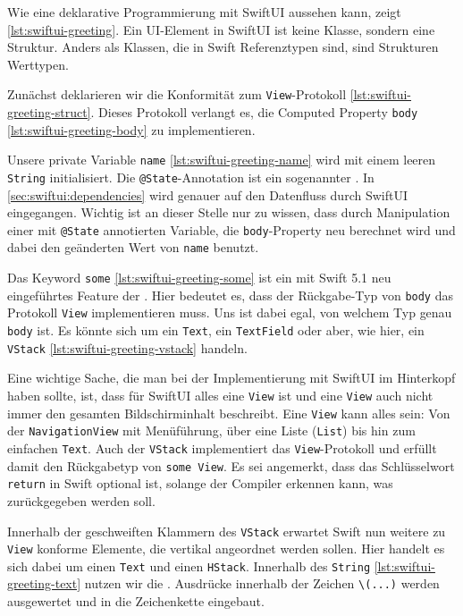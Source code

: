 \begin{bsp}
Wie eine deklarative Programmierung mit SwiftUI \cite{Apple::SwiftUI-Documentation} aussehen kann, zeigt \autoref{lst:swiftui-greeting}. Ein \acl{UI}-Element in SwiftUI ist keine Klasse, sondern eine Struktur. Anders als Klassen, die in Swift Referenztypen sind, sind Strukturen Werttypen.

Zunächst deklarieren wir die Konformität zum \texttt{View}-Protokoll \ref*{lst:swiftui-greeting-struct}. Dieses Protokoll verlangt es, die Computed Property \texttt{body} \ref*{lst:swiftui-greeting-body} zu implementieren.

Unsere private Variable \texttt{name} \ref*{lst:swiftui-greeting-name} wird mit einem leeren \texttt{String} initialisiert. Die \texttt{@State}-Annotation ist ein sogenannter . In \autoref{sec:swiftui:dependencies} wird genauer auf den Datenfluss durch SwiftUI eingegangen. Wichtig ist an dieser Stelle nur zu wissen, dass durch Manipulation einer mit \texttt{@State} annotierten Variable, die \texttt{body}-Property neu berechnet wird und dabei den geänderten Wert von \texttt{name} benutzt.

Das Keyword \texttt{some} \ref*{lst:swiftui-greeting-some} ist ein mit Swift 5.1 neu eingeführtes Feature der . Hier bedeutet es, dass der Rückgabe-Typ von \texttt{body} das Protokoll \texttt{View} implementieren muss. Uns ist dabei egal, von welchem Typ genau \texttt{body} ist. Es könnte sich um ein \texttt{Text}, ein \texttt{TextField} oder aber, wie hier, ein \texttt{VStack} \ref*{lst:swiftui-greeting-vstack} handeln.

Eine wichtige Sache, die man bei der Implementierung mit SwiftUI im Hinterkopf haben sollte, ist, dass für SwiftUI alles eine \texttt{View} ist und eine \texttt{View} auch nicht immer den gesamten Bildschirminhalt beschreibt. Eine \texttt{View} kann alles sein: Von der \texttt{NavigationView} mit Menüführung, über eine Liste (\texttt{List}) bis hin zum einfachen \texttt{Text}. Auch der \texttt{VStack} implementiert das \texttt{View}-Protokoll und erfüllt damit den Rückgabetyp von \texttt{some View}. Es sei angemerkt, dass das Schlüsselwort \texttt{return} in Swift optional ist, solange der Compiler erkennen kann, was zurückgegeben werden soll.

Innerhalb der geschweiften Klammern des \texttt{VStack} erwartet Swift nun weitere zu \texttt{View} konforme Elemente, die vertikal angeordnet werden sollen. Hier handelt es sich dabei um einen \texttt{Text} und einen \texttt{HStack}. Innerhalb des \texttt{String} \ref*{lst:swiftui-greeting-text} nutzen wir die . Ausdrücke innerhalb der Zeichen \texttt{\textbackslash(...)} werden ausgewertet und in die Zeichenkette eingebaut.


\end{bsp}
